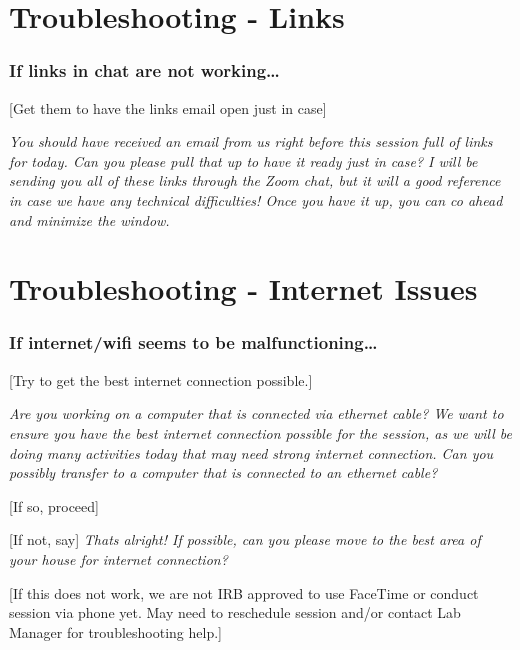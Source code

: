 \documentclass[
]{book}
\begin{document}
\hypertarget{troubleshooting---links}{%
\section{Troubleshooting - Links}\label{troubleshooting---links}}

\hypertarget{if-links-in-chat-are-not-working}{%
\subsubsection{If links in chat are not working\ldots{}}\label{if-links-in-chat-are-not-working}}

{[}Get them to have the links email open just in case{]}

\emph{You should have received an email from us right before this session full of links for today. Can you please pull that up to have it ready just in case? I will be sending you all of these links through the Zoom chat, but it will a good reference in case we have any technical difficulties! Once you have it up, you can co ahead and minimize the window.}

\hypertarget{troubleshooting---internet-issues}{%
\section{Troubleshooting - Internet Issues}\label{troubleshooting---internet-issues}}

\hypertarget{if-internetwifi-seems-to-be-malfunctioning}{%
\subsubsection{If internet/wifi seems to be malfunctioning\ldots{}}\label{if-internetwifi-seems-to-be-malfunctioning}}

{[}Try to get the best internet connection possible.{]}

\emph{Are you working on a computer that is connected via ethernet cable? We want to ensure you have the best internet connection possible for the session, as we will be doing many activities today that may need strong internet connection. Can you possibly transfer to a computer that is connected to an ethernet cable?}

{[}If so, proceed{]}

{[}If not, say{]} \emph{Thats alright! If possible, can you please move to the best area of your house for internet connection?}

{[}If this does not work, we are not IRB approved to use FaceTime or conduct session via phone yet. May need to reschedule session and/or contact Lab Manager for troubleshooting help.{]}
\end{document}
